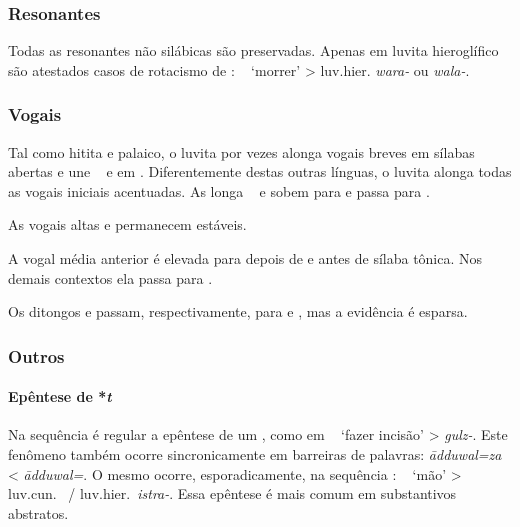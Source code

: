 \subsubsection{Resonantes}

Todas as resonantes não silábicas são preservadas.
Apenas em luvita hieroglífico são atestados casos de rotacismo de
: \pac~ `morrer' > luv.hier.
\emph{wara-} ou \emph{wala-}.

\subsubsection{Vogais}

Tal como hitita e palaico, o luvita por vezes alonga vogais breves em sílabas
abertas e une \pac~ e  em .
Diferentemente destas outras línguas, o luvita alonga todas as vogais iniciais
acentuadas.
As longa \pac~ e  sobem para 
e  passa para .

As vogais altas  e  permanecem estáveis.

A vogal média anterior  é elevada para  depois
de  e antes de sílaba tônica.
Nos demais contextos ela passa para .

Os ditongos  e 
passam, respectivamente, para  e , mas a
evidência é esparsa.

\subsubsection{Outros}

\paragraph{Epêntese de *\emph{t}} Na sequência  é regular a
epêntese de um , como em \pac~
`fazer incisão' > \emph{gulz-}.
Este fenômeno também ocorre sincronicamente em barreiras de palavras:
\emph{ādduwal=za} < \emph{ādduwal=}.
O mesmo ocorre, esporadicamente, na sequência :
\pac~ `mão' >
luv.cun.\ \emph{} \slash{} luv.hier.\ \emph{istra-}.
Essa epêntese é mais comum em substantivos abstratos.

